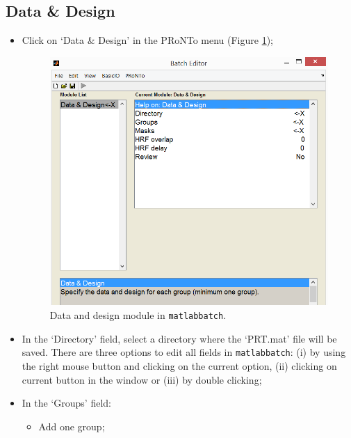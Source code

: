 \subsection{Data \& Design}

\begin{itemize}

	\item Click on `Data \& Design' in the PRoNTo menu (Figure \ref{fig:batchDatamkl});
	
	\begin{figure}[!h]
	
	\centering
		\includegraphics[scale=0.6]{images/Tutorial/mkl/batchDatamkl.png}
	\caption{Data and design module in {\tt matlabbatch}. }
	\label{fig:batchDatamkl}
	
	\end{figure}

	\item In the `Directory' field, select a directory where the `PRT.mat' file will be saved. There are three options to edit all fields in {\tt matlabbatch}: (i) by using the right mouse button and clicking on the current option, (ii) clicking on current button in the window or (iii) by double clicking;
	
	\item In the `Groups' field:
 	
		\begin{itemize}
		
		\item Add one group;
		

\end{itemize}
\end{itemize}

